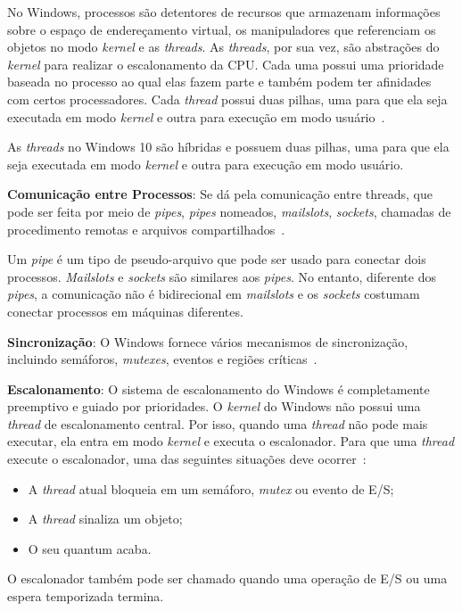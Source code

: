 No Windows, processos são detentores de recursos que armazenam informações sobre o espaço de endereçamento virtual, os manipuladores que referenciam os objetos no modo \emph{kernel} e as \emph{threads}. As \emph{threads}, por sua vez, são abstrações do \emph{kernel} para realizar o escalonamento da CPU. Cada uma possui uma prioridade baseada no processo ao qual elas fazem parte e também podem ter afinidades com certos processadores. Cada \emph{thread} possui duas pilhas, uma para que ela seja executada em modo \emph{kernel} e outra para execução em modo usuário~\cite{tanenbaum}.

As \emph{threads} no Windows 10 são híbridas e possuem duas pilhas, uma para que ela seja executada em modo \emph{kernel} e outra para execução em modo usuário.

\textbf{Comunicação entre Processos}: Se dá pela comunicação entre threads, que pode ser feita por meio de \emph{pipes}, \emph{pipes} nomeados, \emph{mailslots}, \emph{sockets}, chamadas de procedimento remotas e arquivos compartilhados~\cite{tanenbaum}.

Um \emph{pipe} é um tipo de pseudo-arquivo que pode ser usado para conectar dois processos. \emph{Mailslots} e \emph{sockets} são similares aos \emph{pipes}. No entanto, diferente dos \emph{pipes}, a comunicação não é bidirecional em \emph{mailslots} e os \emph{sockets} costumam conectar processos em máquinas diferentes. 

\textbf{Sincronização}: O Windows fornece vários mecanismos de sincronização, incluindo semáforos, \emph{mutexes}, eventos e regiões críticas~\cite{tanenbaum}.

\textbf{Escalonamento}: O sistema de escalonamento do Windows é completamente preemptivo e guiado por prioridades.
O \emph{kernel} do Windows não possui uma \emph{thread} de escalonamento central. Por isso, quando uma \emph{thread} não pode mais executar, ela entra em modo \emph{kernel} e executa o escalonador. Para que uma \emph{thread} execute o escalonador, uma das seguintes situações deve ocorrer~\cite{tanenbaum}:
\begin{itemize}
	\item A \emph{thread} atual bloqueia em um semáforo, \emph{mutex} ou evento de E/S;
	\item A \emph{thread} sinaliza um objeto;
	\item O seu quantum acaba.
\end{itemize}

O escalonador também pode ser chamado quando uma operação de E/S ou uma espera temporizada termina.

